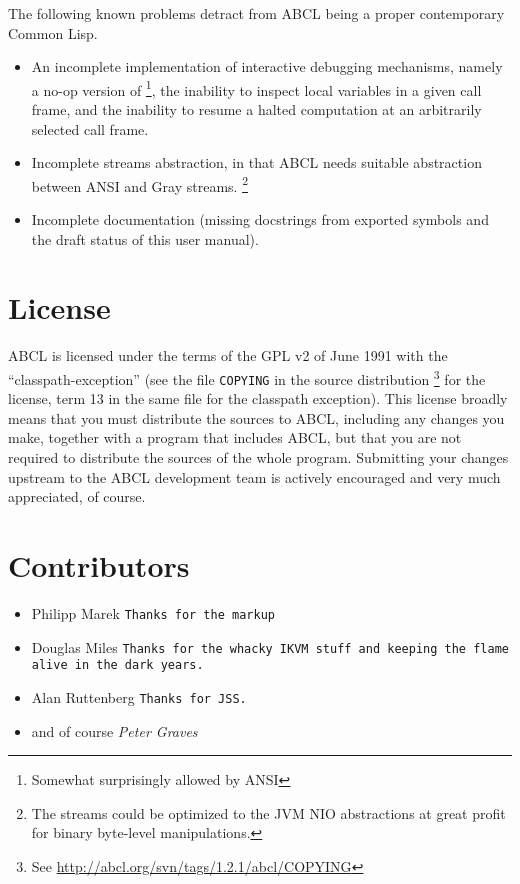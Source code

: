 \documentclass[10pt]{book}
\begin{document}
The following known problems detract from \textsc{ABCL} being a proper
contemporary Common Lisp.
\begin{itemize}
\item An incomplete implementation of interactive debugging mechanisms,
  namely a no-op version of  \footnote{Somewhat surprisingly
    allowed by \textsc{ANSI}}, the inability to inspect local variables
  in a given call frame, and the inability to resume a halted
  computation at an arbitrarily selected call frame.
\item Incomplete streams abstraction, in that \textsc{ABCL} needs
  suitable abstraction between \textsc{ANSI} and Gray
  streams.  \footnote{The streams could be optimized to the
    \textsc{JVM} NIO \cite{nio} abstractions at great profit for
    binary byte-level manipulations.}
\item Incomplete documentation (missing docstrings from exported
  symbols and the draft status of this user manual).
\end{itemize}



\section{License}

\textsc{ABCL} is licensed under the terms of the \textsc{GPL} v2 of
June 1991 with the ``classpath-exception'' (see the file
\texttt{COPYING} in the source distribution \footnote{See
  \url{http://abcl.org/svn/tags/1.2.1/abcl/COPYING}} for
the license, term 13 in the same file for the classpath exception).
This license broadly means that you must distribute the sources to
ABCL, including any changes you make, together with a program that
includes ABCL, but that you are not required to distribute the sources
of the whole program.  Submitting your changes upstream to the ABCL
development team is actively encouraged and very much appreciated, of
course.

\section{Contributors}

\begin{itemize}
\item Philipp Marek \texttt{Thanks for the markup}
\item Douglas Miles \texttt{Thanks for the whacky IKVM stuff and keeping the flame alive
  in the dark years.}
\item Alan Ruttenberg \texttt{Thanks for JSS.}
\item and of course
\emph{Peter Graves}
\end{itemize}
\end{document}
